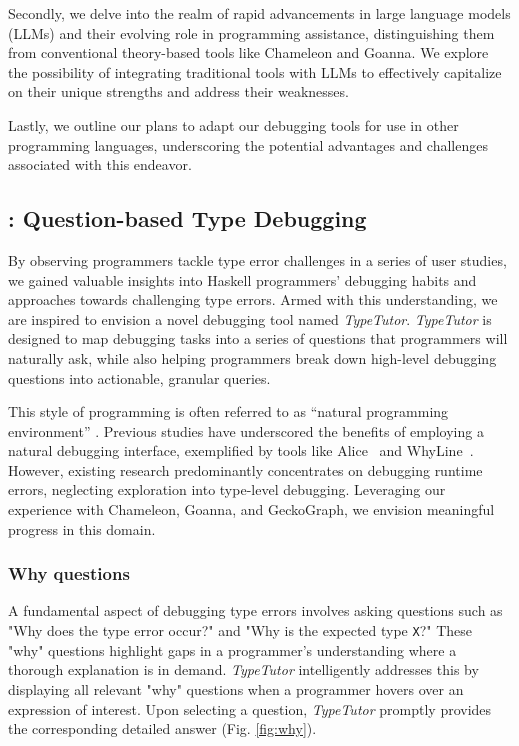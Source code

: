 Secondly, we delve into the realm of rapid advancements in large language models (LLMs) and their evolving role in programming assistance, distinguishing them from conventional theory-based tools like Chameleon and Goanna. We explore the possibility of integrating traditional tools with LLMs to effectively capitalize on their unique strengths and address their weaknesses.

Lastly, we outline our plans to adapt our debugging tools for use in other programming languages, underscoring the potential advantages and challenges associated with this endeavor.

\subsection{\typetutor: Question-based Type Debugging}
By observing programmers tackle type error challenges in a series of user studies, we gained valuable insights into Haskell programmers' debugging habits and approaches towards challenging type errors. Armed with this understanding, we are inspired to envision a novel debugging tool named \textit{TypeTutor}. \textit{TypeTutor} is designed to map debugging tasks into a series of questions that programmers will naturally ask, while also helping programmers break down high-level debugging questions into actionable, granular queries.

This style of programming is often referred to as ``natural programming environment'' \cite{Myers2004-fy}. Previous studies have underscored the benefits of employing a natural debugging interface, exemplified by tools like Alice~\cite{Conway2000-nn} and WhyLine~\cite{Ko2009-uf}. However, existing research predominantly concentrates on debugging runtime errors, neglecting exploration into type-level debugging.  Leveraging our experience with Chameleon, Goanna, and GeckoGraph, we envision meaningful progress in this domain.


\subsubsection{Why questions}

A fundamental aspect of debugging type errors involves asking questions such as "Why does the type error occur?" and "Why is the expected type \texttt{X}?" These "why" questions highlight gaps in a programmer's understanding where a thorough explanation is in demand. \textit{TypeTutor} intelligently addresses this by displaying all relevant "why" questions when a programmer hovers over an expression of interest. Upon selecting a question, \textit{TypeTutor} promptly provides the corresponding detailed answer (Fig. \ref{fig:why}).



